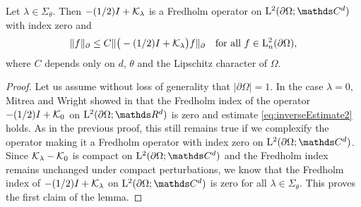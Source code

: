 \begin{lem}
  \label{lem:inverseEstimate}
  Let $\lambda \in \Sigma_\theta$.
  Then $-(1/2)I + \mathcal{K}_\lambda$ is a Fredholm operator on $\Ell^2(\partial\Omega; \C^d)$ with index zero and
  \begin{align}
    \label{eq:inverseEstimate2}
    \| f\|_\partial \leq C \| \big( - (1/2) I + \mathcal{K}_\lambda \big) f \|_\partial \quad\text{for all } f \in \mathrm{L}^2_n(\partial\Omega),
  \end{align}
  where $C$ depends only on $d$, $\theta$ and the Lipschitz character of $\Omega$.
\end{lem}

\begin{proof}
  Let us assume without loss of generality that $|\partial\Omega| = 1$.
  In the case $\lambda = 0$, Mitrea and Wright showed in \cite[Eq. (5.166)]{mitreaWright} that the Fredholm index of the operator $-(1/2)I + \mathcal{K}_0$ on $\Ell^2(\partial\Omega; \R^d)$ is zero and estimate \eqref{eq:inverseEstimate2} holds.
  As in the previous proof, this still remains true if we complexify the operator making it a Fredholm operator with index zero on  $\Ell^2(\partial\Omega; \C^d)$.
  Since $\mathcal{K}_\lambda - \mathcal{K}_0$ is compact on $\Ell^2(\partial\Omega; \C^d)$ and the Fredholm index remains unchanged under compact perturbations, we know that the Fredholm index of $-(1/2)I + \mathcal{K}_\lambda$ on $\Ell^2(\partial\Omega; \C^d)$ is zero for all $\lambda \in \Sigma_\theta$.
  This proves the first claim of the lemma.


\end{proof}
